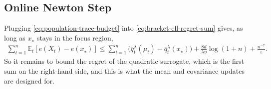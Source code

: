 \documentclass[12pt,cleveref]{jmlr}
\newcommand{\eqlabel}[1]{\label[equality]{#1}}
\newcommand{\R}{\mathbb R}
\newcommand{\E}{\mathbb E}
\newcommand{\argmin}{\operatornamewithlimits{arg\,min}}
\newcommand{\1}{\mathbf 1}
\newcommand{\eps}{\varepsilon}
\newcommand{\normm}[2]{\left\lVert #1\right\rVert_{#2}}
\begin{document}
\subsection{Online Newton Step}
\label{sec:population-ons}
Plugging \cref{eq:population-trace-budget} into \cref{eq:bracket-ell-regret-sum} gives, as long as $x_\star$ stays in the focus region,
\begin{align}
    \sum_{t=1}^n \E_t[e(X_t) - e(x_\star)]
    \leq
    \sum_{t=1}^n \bigl(\bar{q}_t^\lambda(\mu_t) - \bar{q}_t^\lambda(x_\star)\bigr)
    +\frac{8d}{\lambda\eta}\log(1+n)
    +\frac{n^{-7}}{\eps}.
\end{align}
So it remains to bound the regret of the quadratic surrogate, which is the first sum on the right-hand side, and this is what the mean and covariance updates are designed for.
\end{document}
